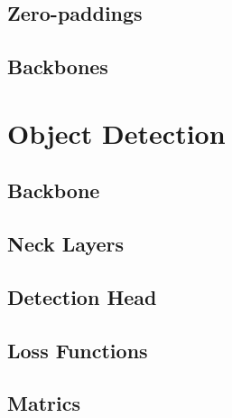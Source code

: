 \documentclass[a4paper]{article}
\begin{document}
\subsection{Zero-paddings}

\subsection{Backbones}

\section{Object Detection}

\subsection{Backbone}

\subsection{Neck Layers}

\subsection{Detection Head}

\subsection{Loss Functions}

\subsection{Matrics}
\end{document}
